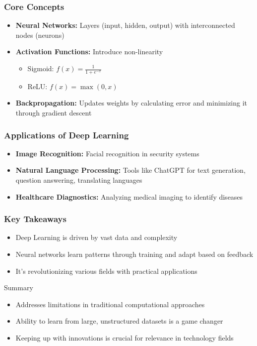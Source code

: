 \documentclass[aspectratio=169]{beamer}
\begin{document}
\begin{frame}[fragile]
    \frametitle{Core Concepts}
    \begin{itemize}
        \item \textbf{Neural Networks:} Layers (input, hidden, output) with interconnected nodes (neurons)
        \item \textbf{Activation Functions:} Introduce non-linearity
        \begin{itemize}
            \item Sigmoid: \( f(x) = \frac{1}{1 + e^{-x}} \)
            \item ReLU: \( f(x) = \max(0, x) \)
        \end{itemize}
        \item \textbf{Backpropagation:} Updates weights by calculating error and minimizing it through gradient descent
    \end{itemize}
\end{frame}

\begin{frame}[fragile]
    \frametitle{Applications of Deep Learning}
    \begin{itemize}
        \item \textbf{Image Recognition:} Facial recognition in security systems
        \item \textbf{Natural Language Processing:} Tools like ChatGPT for text generation, question answering, translating languages
        \item \textbf{Healthcare Diagnostics:} Analyzing medical imaging to identify diseases
    \end{itemize}
\end{frame}

\begin{frame}[fragile]
    \frametitle{Key Takeaways}
    \begin{itemize}
        \item Deep Learning is driven by vast data and complexity
        \item Neural networks learn patterns through training and adapt based on feedback
        \item It's revolutionizing various fields with practical applications
    \end{itemize}
    \begin{block}{Summary}
        \begin{itemize}
            \item Addresses limitations in traditional computational approaches
            \item Ability to learn from large, unstructured datasets is a game changer
            \item Keeping up with innovations is crucial for relevance in technology fields
        \end{itemize}
    \end{block}
\end{frame}
\end{document}

